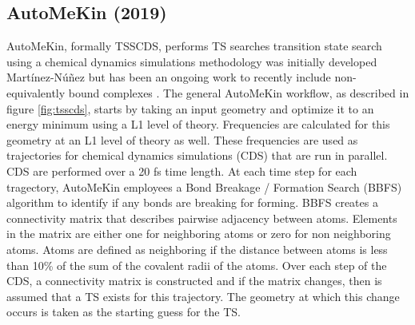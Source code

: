 \documentclass[preprint, 11pt]{elsarticle} %
\begin{document}
\subsection{AutoMeKin (2019)}

AutoMeKin, formally TSSCDS, performs TS searches transition state search using a chemical dynamics simulations methodology was initially developed Martínez-Núñez but has been an ongoing work to recently include non-equivalently bound complexes \cite{Martinez:2015,Martinez:2015jccp,rodriguez:2018,mopac:2016}.
The general AutoMeKin workflow, as described in figure \ref{fig:tsscds}, starts by taking an input geometry and optimize it to an energy minimum using a L1 level of theory.
Frequencies are calculated for this geometry at an L1 level of theory as well.
These frequencies are used as trajectories for chemical dynamics simulations (CDS) that are run in parallel.
CDS are performed over a 20 fs time length.
At each time step for each tragectory, AutoMeKin employees a Bond Breakage / Formation Search (BBFS) algorithm to identify if any bonds are breaking for forming. 
BBFS creates a connectivity matrix that describes pairwise adjacency between atoms. 
Elements in the matrix are either one for neighboring atoms or zero for non neighboring atoms. 
Atoms are defined as neighboring if the distance between atoms is less than 10\% of the sum of the covalent radii of the atoms. 
Over each step of the CDS, a connectivity matrix is constructed and if the matrix changes, then is assumed that a TS exists for this trajectory.
The geometry at which this change occurs is taken as the starting guess for the TS.
\end{document}
